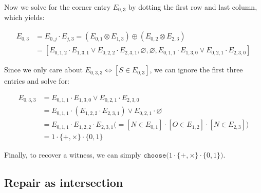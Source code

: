 \documentclass[sigplan,review,acmsmall,nonacm,screen,anonymous]{acmart}\settopmatter{printfolios=false,printccs=false,printacmref=false}
\begin{document}
\noindent Now we solve for the corner entry $E_{0, 3}$ by dotting the first row and last column, which yields:\vspace{-8pt}

\begin{align*}
  E_{0, 3} &= E_{0, j} \cdot E_{j, 3} = (E_{0, 1} \otimes E_{1, 3}) \oplus (E_{0, 2} \otimes E_{2, 3})\\
  &= [E_{0, 1, 2} \cdot E_{1, 3, 1} \lor E_{0, 2, 2} \cdot E_{2, 3, 1}, \varnothing, \varnothing, E_{0, 1, 1} \cdot E_{1, 3, 0} \lor E_{0, 2, 1} \cdot E_{2, 3, 0}]
\end{align*}

\noindent Since we only care about $E_{0, 3, 3} \Leftrightarrow [S \in E_{0, 3}]$, we can ignore the first three entries and solve for:\vspace{-8pt}

\begin{align*}
  E_{0, 3, 3} &= E_{0, 1, 1} \cdot E_{1, 3, 0} \lor E_{0, 2, 1} \cdot E_{2, 3, 0}\\
  &= E_{0, 1, 1} \cdot (E_{1, 2, 2} \cdot E_{2, 3, 1}) \lor E_{0, 2, 1} \cdot \varnothing\\
  &= E_{0, 1, 1} \cdot E_{1, 2, 2} \cdot E_{2, 3, 1} \big(= [N \in E_{0, 1}] \cdot [O \in E_{1, 2}] \cdot [N \in E_{2, 3}]\big)\\
  &= 1 \cdot \{+, \times\} \cdot \{0, 1\}
\end{align*}

\noindent Finally, to recover a witness, we can simply $\texttt{choose}\big(1 \cdot \{+, \times\} \cdot \{0, 1\}\big)$.


\subsection{Repair as intersection}\label{sec:repair_ex}
\end{document}
